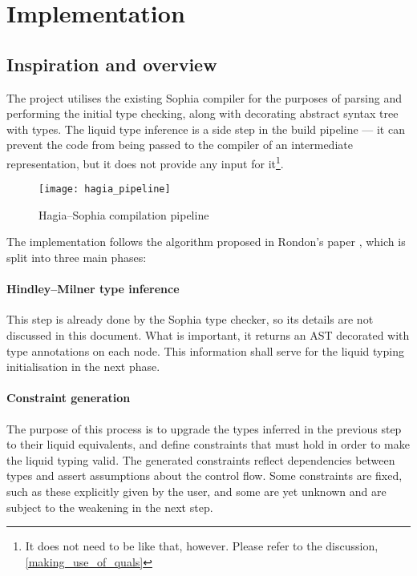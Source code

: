 \chapter{Implementation}
\label{implementation}

\section{Inspiration and overview}

The project utilises the existing Sophia compiler for the purposes of parsing
and performing the initial type checking, along with decorating abstract syntax
tree with types. The liquid type inference is a side step in the build pipeline
--- it can prevent the code from being passed to the compiler of an intermediate
representation, but it does not provide any input for it\footnote{It does not
  need to be like that, however. Please refer to the discussion,
  \autoref{making_use_of_quals}}.

\begin{figure}[h]
  \caption{Hagia--Sophia compilation pipeline}
  \centering
  \texttt{[image: hagia\_pipeline]}
\end{figure}

The implementation follows the algorithm proposed in Rondon's paper
\cite{liquid}, which is split into three main phases:

\subsubsection{Hindley--Milner type inference}

This step is already done by the Sophia type checker, so its details are not
discussed in this document. What is important, it returns an AST decorated with
type annotations on each node. This information shall serve for the liquid
typing initialisation in the next phase.

\subsubsection{Constraint generation}

The purpose of this process is to upgrade the types inferred in the previous
step to their liquid equivalents, and define constraints that must hold in order
to make the liquid typing valid. The generated constraints reflect dependencies
between types and assert assumptions about the control flow. Some constraints
are fixed, such as these explicitly given by the user, and some are yet unknown
and are subject to the weakening in the next step.

